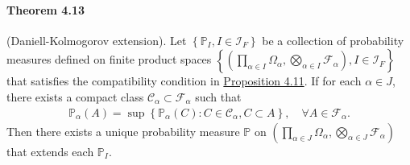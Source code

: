 \documentclass{article}
\numberwithin{equation}{section}
\renewcommand{\P}{\mathbb{P}}
\theoremstyle{plain}
\theoremstyle{definition}
\begin{document}
\paragraph{Theorem 4.13\label{thm:4.13}} (Daniell-Kolmogorov extension). Let $\left\{\P_I,I\in\mathcal{I}_F\right\}$ be a collection of probability measures defined on finite product spaces $\left\{\left(\prod_{\alpha\in I}\Omega_\alpha,\bigotimes_{\alpha\in I}\mathscr{F}_\alpha\right),I\in\mathcal{I}_F\right\}$ that satisfies the compatibility condition in \hyperref[prop:4.11]{Proposition 4.11}. If for each $\alpha\in J$, there exists a compact class $\mathscr{C}_\alpha\subset\mathscr{F}_\alpha$ such that 
\begin{align*}
\P_{\alpha}(A)=\sup\left\{\P_{\alpha}(C):C\in\mathscr{C}_\alpha,C\subset A\right\},\quad\forall A\in\mathscr{F}_\alpha.	
\end{align*}
Then there exists a unique probability measure $\P$ on $\left(\prod_{\alpha\in J}\Omega_\alpha,\bigotimes_{\alpha\in J}\mathscr{F}_\alpha\right)$ that extends each $\P_I$.
\end{document}
